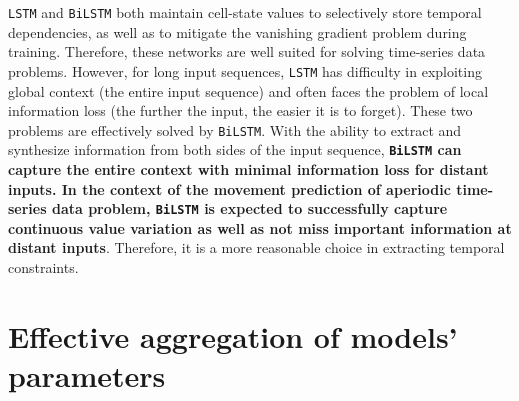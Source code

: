 
\verb|LSTM| and \verb|BiLSTM| both maintain cell-state values to selectively store temporal dependencies, as well as to mitigate the vanishing gradient problem during training. Therefore, these networks are well suited for solving time-series data problems. However, for long input sequences, \verb|LSTM| has difficulty in exploiting global context (the entire input sequence) and often faces the problem of local information loss (the further the input, the easier it is to forget). These two problems are effectively solved by \verb|BiLSTM|. With the ability to extract and synthesize information from both sides of the input sequence, \textbf{\Verb|BiLSTM| can capture the entire context with minimal information loss for distant inputs. In the context of the movement prediction of aperiodic time-series data problem, \Verb|BiLSTM| is expected to successfully capture continuous value variation as well as not miss important information at distant inputs}. Therefore, it is a more reasonable choice in extracting temporal constraints.

\clearpage


\section{Effective aggregation of models' parameters}

